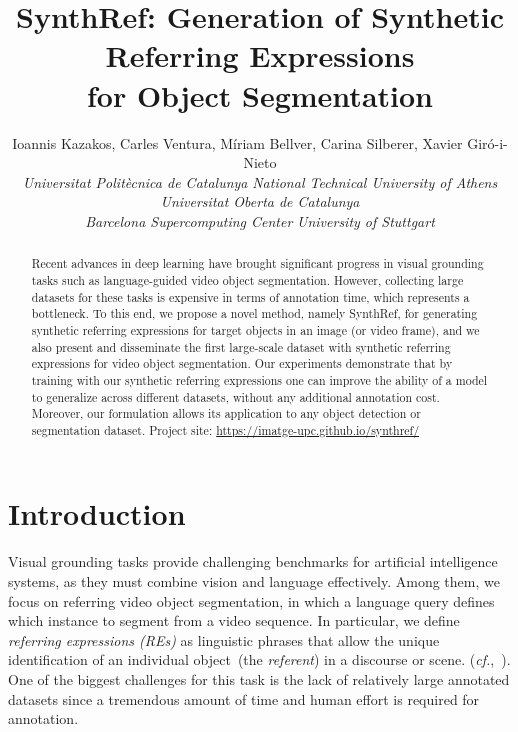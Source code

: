 \documentclass[11pt]{article}
\title{SynthRef: Generation of Synthetic Referring Expressions \\for Object Segmentation}
\author{Ioannis Kazakos, Carles Ventura, Míriam Bellver, Carina Silberer, Xavier Giró-i-Nieto  \\
   \small\emph{Universitat Politècnica de Catalunya}\quad
   \small\emph{National Technical University of Athens}\quad
    \small\emph{Universitat Oberta de Catalunya}\\
   \small\emph{Barcelona Supercomputing Center}\quad  
   \small\emph{University of Stuttgart}\\
}
\newcommand{\cf}{\textit{cf.}}
\begin{document}
\maketitle
\begin{abstract}
Recent advances in deep learning have brought significant progress 
in visual grounding tasks such as language-guided video object segmentation. However, collecting large datasets for these tasks is expensive in terms of annotation time, which represents a bottleneck. To this end, 
we propose a novel method, namely SynthRef, for generating synthetic referring expressions for target objects in an image (or video frame), and we also present and disseminate the first large-scale dataset with synthetic referring expressions for video object segmentation. Our experiments demonstrate that by training with our synthetic referring expressions one can improve the ability of a model to generalize across different datasets, without any additional annotation cost. Moreover, our formulation allows its application to any object detection or segmentation dataset. \noindent Project site: \url{https://imatge-upc.github.io/synthref/}
\end{abstract}

\section{Introduction}
\label{sec:introduction}



Visual grounding tasks provide challenging benchmarks for 
artificial intelligence systems, as they must combine vision and language effectively. 
Among them, we focus on 
referring video object segmentation, in which a language query defines which instance to segment from a video sequence. 
In particular, we define \textit{referring expressions (REs)} as linguistic phrases that allow the unique identification of an individual object~(the \textsl{referent}) in a discourse or scene. 
 (\cf,~\citealt{reiter1992fast,qiao2020referring}).
One of the biggest challenges for this task is the lack of relatively large annotated datasets since a tremendous amount of time and human effort is required for annotation.
\end{document}
